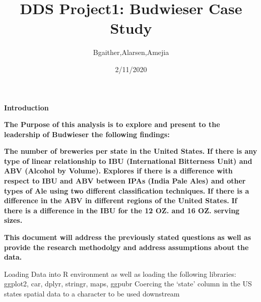\documentclass[
]{article}
\title{DDS Project1: Budwieser Case Study}
\author{Bgaither,Alarsen,Amejia}
\date{2/11/2020}
\newenvironment{Shaded}{\begin{snugshade}}{\end{snugshade}}
\newcommand{\CommentTok}[1]{\textcolor[rgb]{0.56,0.35,0.01}{\textit{#1}}}
\newcommand{\DataTypeTok}[1]{\textcolor[rgb]{0.13,0.29,0.53}{#1}}
\newcommand{\KeywordTok}[1]{\textcolor[rgb]{0.13,0.29,0.53}{\textbf{#1}}}
\newcommand{\NormalTok}[1]{#1}
\newcommand{\OperatorTok}[1]{\textcolor[rgb]{0.81,0.36,0.00}{\textbf{#1}}}
\newcommand{\OtherTok}[1]{\textcolor[rgb]{0.56,0.35,0.01}{#1}}
\newcommand{\StringTok}[1]{\textcolor[rgb]{0.31,0.60,0.02}{#1}}
\begin{document}
\maketitle

\textbf{Introduction}

\textbf{The Purpose of this analysis is to explore and present to the
leadership of Budwieser the following findings:}

\textbf{The number of breweries per state in the United States.}
\textbf{If there is any type of linear relationship to IBU
(International Bitterness Unit) and ABV (Alcohol by Volume).}
\textbf{Explores if there is a difference with respect to IBU and ABV
between IPAs (India Pale Ales) and other types of Ale using two
different classification techniques.} \textbf{If there is a difference
in the ABV in different regions of the United States.} \textbf{If there
is a difference in the IBU for the 12 OZ. and 16 OZ. serving sizes.}

\textbf{This document will address the previously stated questions as
well as provide the research methodolgy and address assumptions about
the data.}

Loading Data into R environment as well as loading the following
libraries: ggplot2, car, dplyr, stringr, maps, ggpubr Coercing the
`state' column in the US states spatial data to a character to be used
downstream

\begin{Shaded}
\end{Shaded}
\end{document}

